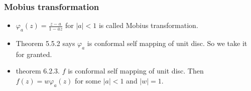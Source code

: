 \documentclass{beamer}
\begin{document}
\begin{frame}
	\frametitle{Mobius transformation}
	\begin{itemize}
		\item $\varphi_a(z) = \frac{z-a}{1-\bar{a}z}$ for $|a| <1$ is called Mobius transformation. 

		\item Theorem 5.5.2 says $\varphi_a$ is conformal self mapping of unit disc. So we take it for granted.

		\item 
			\begin{alertblock}{theorem 6.2.3.}
				$f$ is conformal self mapping of unit disc. Then $f(z) = w \varphi_a(z)$ for some $|a|<1$ and $|w| = 1$. 
				
			\end{alertblock}
	\end{itemize}

\end{frame}
\end{document}
